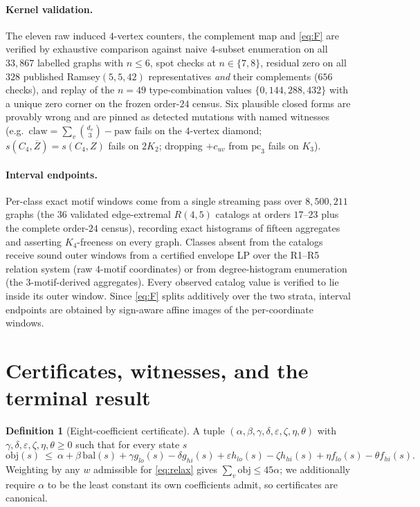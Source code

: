 \documentclass[11pt]{article}
\theoremstyle{definition}
\newtheorem{definition}[theorem]{Definition}
\newcommand{\Rams}{R}
\begin{document}
\paragraph{Kernel validation.} The eleven raw induced $4$-vertex counters, the
complement map and \eqref{eq:F} are verified by exhaustive comparison against
naive $4$-subset enumeration on all $33{,}867$ labelled graphs with $n\le6$,
spot checks at $n\in\{7,8\}$, residual zero on all $328$ published
Ramsey$(5,5,42)$ representatives \emph{and} their complements ($656$ checks),
and replay of the $n=49$ type-combination values
$\{0,144,288,432\}$ with a unique zero corner on the frozen order-$24$ census.
Six plausible closed forms are provably wrong and are pinned as detected
mutations with named witnesses (e.g.\ $\mathrm{claw}=\sum_v\binom{d_v}{3}-\mathrm{paw}$
fails on the $4$-vertex diamond; $s(C_4,\overline Z)=s(C_4,Z)$ fails on $2K_2$;
dropping $+c_{uv}$ from $\mathrm{pc}_3$ fails on $K_3$).

\paragraph{Interval endpoints.} Per-class exact motif windows come from a single
streaming pass over $8{,}500{,}211$ graphs (the $36$ validated edge-extremal
$\Rams(4,5)$ catalogs at orders $17$--$23$ plus the complete order-$24$ census),
recording exact histograms of fifteen aggregates and asserting $K_4$-freeness on
every graph. Classes absent from the catalogs receive sound outer windows from a
certified envelope LP over the R1--R5 relation system (raw $4$-motif
coordinates) or from degree-histogram enumeration (the $3$-motif-derived
aggregates). Every observed catalog value is verified to lie inside its outer
window. Since \eqref{eq:F} splits additively over the two strata, interval
endpoints are obtained by sign-aware affine images of the per-coordinate windows.

\section{Certificates, witnesses, and the terminal result}

\begin{definition}[Eight-coefficient certificate]
A tuple $(\alpha,\beta,\gamma,\delta,\varepsilon,\zeta,\eta,\theta)$ with
$\gamma,\delta,\varepsilon,\zeta,\eta,\theta\ge0$ such that for every state $s$
\[
\mathrm{obj}(s)\ \le\ \alpha+\beta\,\mathrm{bal}(s)
+\gamma g_{lo}(s)-\delta g_{hi}(s)
+\varepsilon h_{lo}(s)-\zeta h_{hi}(s)
+\eta f_{lo}(s)-\theta f_{hi}(s).
\]
Weighting by any $w$ admissible for \eqref{eq:relax} gives
$\sum_v \mathrm{obj}\le 45\alpha$; we additionally require $\alpha$ to be the
least constant its own coefficients admit, so certificates are canonical.
\end{definition}
\end{document}
